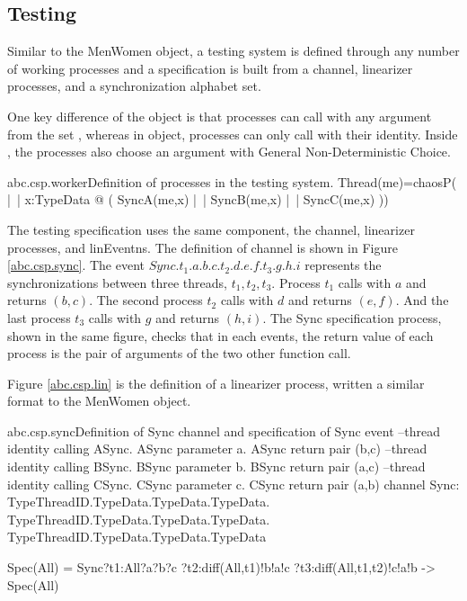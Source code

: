 \documentclass[a4paper, 12pt]{article}
\begin{document}
\subsection{Testing}
Similar to the MenWomen object, a testing system is defined through any number of working processes and a specification is built from a  channel, linearizer processes, and a synchronization alphabet set. 

One key difference of the  object is that processes can call with any argument from the set , whereas in  object, processes can only call with their identity. Inside , the processes also choose an argument with General Non-Deterministic Choice. 

\begin{cspinline}{abc.csp.worker}{Definition of processes in the testing system.}
Thread(me)=chaosP( |~| x:TypeData @ (
    SyncA(me,x) 
  |~| SyncB(me,x) 
  |~| SyncC(me,x)
))
\end{cspinline}

The testing specification uses the same component, the  channel, linearizer processes, and linEventns. The definition of  channel is shown in Figure \ref{abc.csp.sync}. The event $Sync.t_1.a.b.c.t_2.d.e.f.t_3.g.h.i$ represents the synchronizations between three threads, $t_1,t_2,t_3$. Process $t_1$ calls  with $a$ and returns $(b,c)$. The second process $t_2$ calls  with $d$ and returns $(e,f)$. And the last process $t_3$ calls  with $g$ and returns $(h,i)$. The Sync specification process, shown in the same figure, checks that in each  events, the return value of each process is the pair of arguments of the two other function call. 

Figure \ref{abc.csp.lin} is the definition of a linearizer process, written a similar format to the MenWomen object.

\begin{cspfloat}{abc.csp.sync}{Definition of Sync channel and specification of Sync event}
--thread identity calling ASync. ASync parameter a. ASync return pair (b,c)
--thread identity calling BSync. BSync parameter b. BSync return pair (a,c)
--thread identity calling CSync. CSync parameter c. CSync return pair (a,b)
channel Sync: TypeThreadID.TypeData.TypeData.TypeData.
              TypeThreadID.TypeData.TypeData.TypeData.
              TypeThreadID.TypeData.TypeData.TypeData

Spec(All) = 
  Sync?t1:All?a?b?c
      ?t2:diff(All,{t1})!b!a!c
      ?t3:diff(All,{t1,t2})!c!a!b -> 
  Spec(All)
\end{cspfloat}
\end{document}
